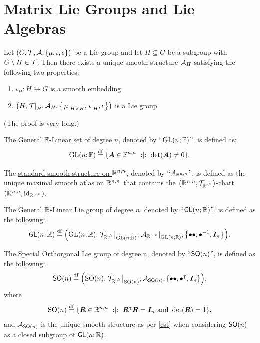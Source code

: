 \documentclass[11pt,reqno]{amsart}
\begin{document}
\section{Matrix Lie Groups and Lie Algebras}

\begin{Thm}
\label{cst}
Let $(G,\T,\A,\set{\mu,\iota,e})$ be a Lie group and let $H\subseteq G$
be a subgroup with $G\setminus H\in\mathcal{T}$.
Then there exists a unique smooth structure $\mathcal{A}_H$
satisfying the following two properties:
\begin{enumerate}
\item $\iota_H\colon H\hookrightarrow G$ is a smooth embedding.
\item $\Br{H,\eval{\T}_H,\A_H,\set{\eval{\mu}_{H\times H},\eval{\iota}_H,e}}$
is a Lie group.
\end{enumerate}
\end{Thm}
(The proof is very long.)


\begin{Def}
The \ul{General $\mathbb{F}$-Linear set of degree $n$},
denoted by ``$\operatorname{GL}(n;\mathbb{F})$'', is defined as:
\[
\GLset(n;\F)\df\set{\bm A\in\F^{n,n}\st\det\Br{\bm A}\ne 0}.
\]
\end{Def}

\begin{Def}
The \ul{standard smooth structure on $\mathbb{R}^{n,n}$},
denoted by ``$\mathcal{A}_{\mathbb{R}^{n,n}}$'',
is defined as the unique maximal smooth atlas on $\mathbb{R}^{n,n}$ that contains
the $\Br{\R^{n,n},\T_{\R^{n^2}}}$-chart $\Br{\R^{n,n},\id_{\R^{n,n}}}$.
\end{Def}

\begin{Def}
The \ul{General $\mathbb{R}$-Linear Lie group of degree $n$},
denoted by ``$\operatorname{\mathsf{GL}}(n;\mathbb{R})$'', is defined as the following:
\[
\GL(n;\R)\df\Br{\GLset(n;\R),\eval{\T_{\R^{n^2}}}_{\GLset(n;\R)},
\eval{\A_{\R^{n,n}}}_{\GLset(n;\R)},\set{
\bullet\bullet,\bullet\inv,\bm I_n}}.
\]
\end{Def}

\begin{Def}
The \ul{Special Orthorgonal Lie group of degree n}, denoted by ``$\operatorname{\mathsf{SO}}(n)$'',
is defined as the following:
\[
\SO(n)\df\Br{\SOset(n),\eval{\T_{\R^{n^2}}}_{\SOset(n)},\A_{\SO(n)},
\set{\bullet\bullet,\bullet\transp,\bm I_n}},
\]
where
\[
\SOset(n)\df\set{\bm R\in\R^{n,n}\st\bm R\transp\bm R=\bm I_n
\tand\det\Br{\bm R}=1},
\]
and $\mathcal{A}_{\operatorname{\mathsf{SO}}(n)}$ is the unique smooth structure as per \ref{cst}
when considering $\operatorname{\mathsf{SO}}(n)$ as a closed subgroup of $\operatorname{\mathsf{GL}}(n;\mathbb{R})$.
\end{Def}
\end{document}

